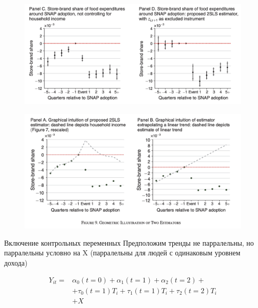 \begin{frame}{\textcite{hastings2018snap}}

\begin{figure}
    \centering
    \includegraphics[width=\textwidth]{Images/did_controls.png}
\end{figure}


\end{frame}



\begin{frame}{}

\begin{figure}
    \centering
    \includegraphics[width=\textwidth]{Images/linear_or_confounder.png}
\end{figure}

\end{frame}

\begin{frame}{Включение контрольных переменных}
Предположим тренды не парралельны, но парралельны условно на X (парралельны для людей с одинаковым уровнем дохода)

\begin{align*}
    Y_{it} = & \alpha_0 (t=0) + \alpha_1  (t=1) + \alpha_2 (t=2) + \\
     &+ \tau_0 (t=1) T_{i} + \tau_1 (t=1) T_{i} + \tau_2 (t=2) T_{i} \\
     &+ X
\end{align*}

    
\end{frame}

